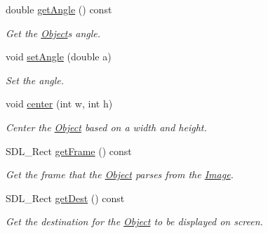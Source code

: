 \begin{DoxyCompactItemize}
\mbox{\label{classObject_a9958ed5111be9373ef97cb20d00b625f}} 
double \hyperlink{classObject_a9958ed5111be9373ef97cb20d00b625f}{get\+Angle} () const
\begin{DoxyCompactList}\small\item\em Get the \hyperlink{classObject}{Object}\textquotesingle{}s angle. \end{DoxyCompactList}\item 
\mbox{\label{classObject_a17b2cae6baa17a776d13243841d39c77}} 
void \hyperlink{classObject_a17b2cae6baa17a776d13243841d39c77}{set\+Angle} (double a)
\begin{DoxyCompactList}\small\item\em Set the angle. \end{DoxyCompactList}\item 
\mbox{\label{classObject_a95af63b61c22ac2a8117742b9fa0efb5}} 
void \hyperlink{classObject_a95af63b61c22ac2a8117742b9fa0efb5}{center} (int w, int h)
\begin{DoxyCompactList}\small\item\em Center the \hyperlink{classObject}{Object} based on a width and height. \end{DoxyCompactList}\item 
\mbox{\label{classObject_a6609d1397cf1924cb02ee6f01c1a413d}} 
S\+D\+L\+\_\+\+Rect \hyperlink{classObject_a6609d1397cf1924cb02ee6f01c1a413d}{get\+Frame} () const
\begin{DoxyCompactList}\small\item\em Get the frame that the \hyperlink{classObject}{Object} parses from the \hyperlink{classImage}{Image}. \end{DoxyCompactList}\item 
\mbox{\label{classObject_adbce026da4c69c90c9ebac96d06b701d}} 
S\+D\+L\+\_\+\+Rect \hyperlink{classObject_adbce026da4c69c90c9ebac96d06b701d}{get\+Dest} () const
\begin{DoxyCompactList}\small\item\em Get the destination for the \hyperlink{classObject}{Object} to be displayed on screen. \end{DoxyCompactList}\item 
\mbox{\label{classObject_abd35d67f6a3a23284887feed5ad26c9a}} 

\end{DoxyCompactItemize}
